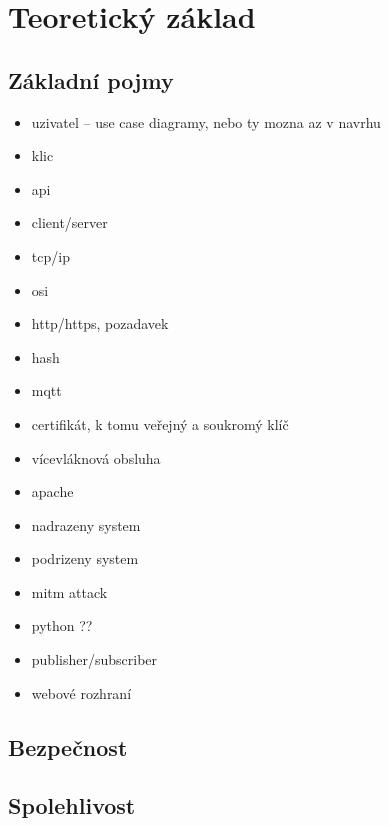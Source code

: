 \chapter{Teoretický základ}
\label{sec:te}

\section{Základní pojmy}

\begin{itemize}
    \item uzivatel -- use case diagramy, nebo ty mozna az v navrhu
    \item klic
    \item api
    \item client/server
    \item tcp/ip
    \item osi
    \item http/https, pozadavek
    \item hash
    \item mqtt
    \item certifikát, k tomu veřejný a soukromý klíč
    \item vícevláknová obsluha
    \item apache
    \item nadrazeny system
    \item podrizeny system
    \item mitm attack
    \item python ??
    \item publisher/subscriber
    \item webové rozhraní
\end{itemize}

\section{Bezpečnost}

\section{Spolehlivost}